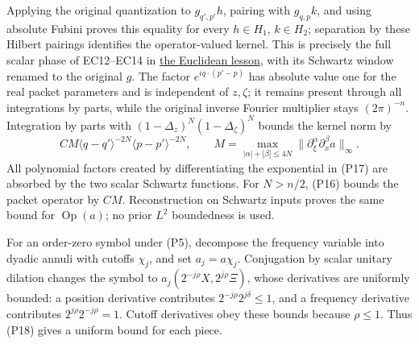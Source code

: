 \documentclass[
  11pt,
]{article}
\begin{document}
Applying the original quantization to \(g_{q',p'}h\), pairing with
\(g_{q,p}k\), and using absolute Fubini proves this equality for every
\(h\in H_1\), \(k\in H_2\); separation by these Hilbert pairings
identifies the operator-valued kernel. This is precisely the full scalar
phase of EC12--EC14 in
\href{euclidean-symbol-calculus.pdf\#section*.36}{the
Euclidean lesson}, with its Schwartz window renamed to the original
\(g\). The factor \(e^{iq\cdot(p'-p)}\) has absolute value one for the
real packet parameters and is independent of \(z,\zeta\); it remains
present through all integrations by parts, while the original inverse
Fourier multiplier stays \((2\pi)^{-n}\). Integration by parts with
\((1-\Delta_z)^N(1-\Delta_\zeta)^N\) bounds the kernel norm by \[
 C M\langle q-q'\rangle^{-2N}\langle p-p'\rangle^{-2N},
 \qquad
 M=\max_{|\alpha|+|\beta|\leq4N}
 \|\partial_\xi^\alpha\partial_x^\beta a\|_\infty.
\tag{P18}
\] All polynomial factors created by differentiating the exponential in
(P17) are absorbed by the two scalar Schwartz functions. For \(N>n/2\),
(P16) bounds the packet operator by \(CM\). Reconstruction on Schwartz
inputs proves the same bound for \(\operatorname{Op}(a)\); no prior
\(L^2\) boundedness is used.

For an order-zero symbol under (P5), decompose the frequency variable
into dyadic annuli with cutoffs \(\chi_j\), and set \(a_j=a\chi_j\).
Conjugation by scalar unitary dilation changes the symbol to
\(a_j(2^{-j\rho}X,2^{j\rho}\Xi)\), whose derivatives are uniformly
bounded: a position derivative contributes
\(2^{-j\rho}2^{j\delta}\leq1\), and a frequency derivative contributes
\(2^{j\rho}2^{-j\rho}=1\). Cutoff derivatives obey these bounds because
\(\rho\leq1\). Thus (P18) gives a uniform bound for each piece.
\end{document}
